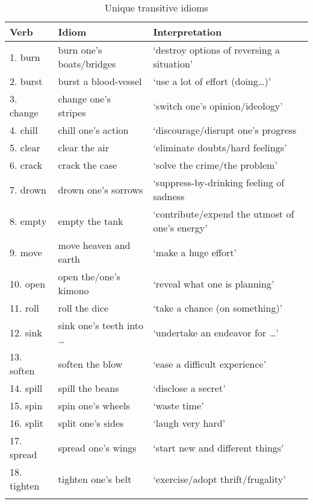 \documentclass[output=paper]{langsci/langscibook}
\begin{document}
\begin{table}[p]
\small
\caption{Unique transitive idioms}
\begin{tabularx}{\textwidth}{llQ}
\lsptoprule
{Verb} & {Idiom} & {Interpretation} \\
\midrule
{1. burn}  & burn one’s boats/bridges & ‘destroy options of reversing a situation’ \\
{2. burst}  & burst a blood-vessel & ‘use a lot of effort (doing…)’\\
{3. change} & change one’s stripes~ & ‘switch one’s opinion/ideology’ \\
{4. chill}  & chill one’s action & ‘discourage/disrupt one’s progress \\
{5. clear}  & clear the air & ‘eliminate doubts/hard feelings’\\
{6. crack}  & crack the case & ‘solve the crime/the problem’ \\
{7. drown}  & drown one’s sorrows & ‘suppress-by-drinking feeling of sadness\\
{8. empty}  & empty the tank & ‘contribute/expend the utmost of one’s energy’ \\
{9. move}  & move heaven and earth & ‘make a huge effort’ \\
{10. open}  & open the/one’s kimono & ‘reveal what one is planning’\\
{11. roll}  & roll the dice & ‘take a chance (on something)’ \\
{12. sink}  & sink one’s teeth into \dots & ‘undertake an endeavor for \dots’\\
{13. soften}  & soften the blow & ‘ease a difficult experience’ \\
{14. spill}  & spill the beans & ‘disclose a secret’ \\
{15. spin}  & spin one’s wheels & ‘waste time’\\
{16. split}  & split one’s sides & ‘laugh very hard’\\
{17. spread}  & spread one’s wings & ‘start new and different things’  \\
{18. tighten} & tighten one’s belt & ‘exercise/adopt thrift/frugality’\\
\lspbottomrule
\end{tabularx}
\end{table}
\end{document}
